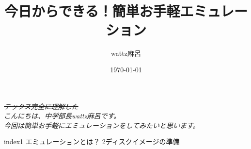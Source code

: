 \documentclass[b5paper,10pt]{jsarticle}
\begin{document}
\title{今日からできる！簡単お手軽エミュレーション}
\author{wattz麻呂}
\date{\today}
\maketitle
\thispagestyle{empty}

\begin{multicols*}{3}
  
\it  \sout{テックス完全に理解した} \sc \\
こんにちは、中学部長wattz麻呂です。\\
今回は簡単お手軽にエミュレーションをしてみたいと思います。\\
\begin{itembox}{index}{1}
エミュレーションとは？
{2}ディスクイメージの準備
\end{itembox}

\end{multicols*}
\end{document}
